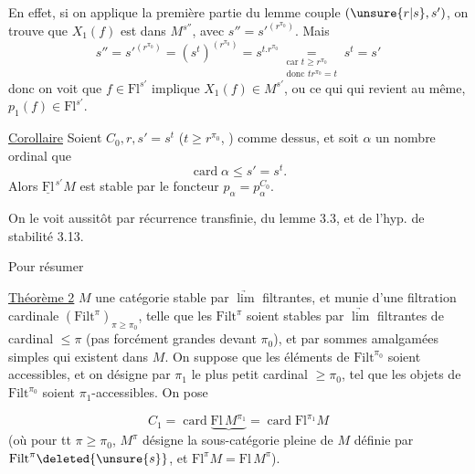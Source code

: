 En effet, si on applique la première partie du
lemme  couple $(\unsure{r|s},s')$, on trouve que
$X_1(f)$ est dans $M^{s''}$, avec $s''={s'}^{(r^{\pi_0})}$. Mais
\[
s''={s'}^{(r^{\pi_0})}=(s^t)^{(r^{\pi_0})}
=s^{t.r^{\pi_0}}\underset{\substack{\text{car }t\geq r^{\pi_0}\\\text{donc }tr^{\pi_0}=t}}{=}
s^t=s'
\]
donc on voit que $f\in\mathrm{Fl}^{s'}$ implique $X_1(f)\in M^{s'}$, ou
ce qui qui revient au même, $p_1(f)\in\mathrm{Fl}^{s'}$.

\uline{Corollaire} Soient $C_0,r,s'=s^t$ ($t\geq r^{\pi_0}$, ) comme
dessus, et soit $\alpha$ un nombre ordinal  
 que
\[
\operatorname{card}\alpha\leq s'=s^t.
\]
Alors $\underline{\mathrm{Fl}}^{\,s'}M$ est stable par le foncteur $p_\alpha=p_\alpha^{C_0}$.

On le voit aussitôt par récurrence transfinie,
   du lemme 3.3, et de l'hyp. de
stabilité 3.13.

Pour résumer

\uline{Théorème 2}  $M$ une catégorie stable par  $\underrightarrow{\lim}$
filtrantes, et munie d'une filtration cardinale
$(\mathrm{Filt}^\pi)_{\pi\geq\pi_0}$, telle que les $\mathrm{Filt}^\pi$ soient stables
par $\underrightarrow{\lim}$ filtrantes de cardinal $\leq\pi$ (pas forcément
grandes devant $\pi_0$), et par  sommes amalgamées simples
qui existent dans $M$. On suppose que les éléments
de $\mathrm{Filt}^{\pi_0}$ soient accessibles, et on désigne par
$\pi_1$ le plus petit cardinal $\geq\pi_0$, tel que les objets de
$\mathrm{Filt}^{\pi_0}$ soient $\pi_1$-accessibles. On pose 

\[
C_1=\operatorname{card}\underbrace{\mathrm{Fl}\,M^{\pi_1}}=\operatorname{card}\mathrm{Fl}^{\pi_1}M
\]
(où pour tt $\pi\geq\pi_0$, $M^\pi$ désigne la sous-catégorie 
pleine de $M$ définie par $\mathrm{Filt}^\pi\deleted{\unsure{s}}$, et $\mathrm{Fl}^\pi M=\mathrm{Fl}\,M^\pi$).

